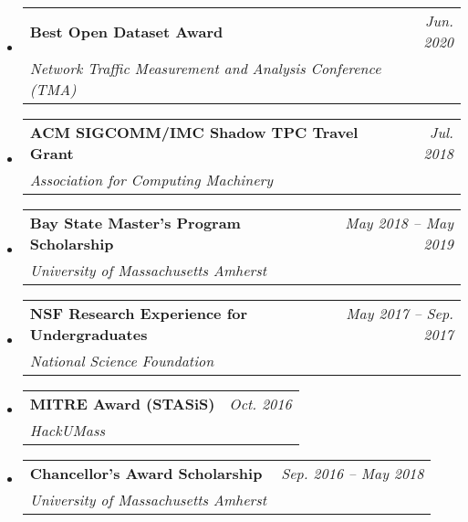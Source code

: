 \documentclass[letterpaper,11pt]{article}
\makeatletter
\newcommand{\ressubheadingNONITtwo}[4]{
\begin{tabular*}{6.5in}{l@{\cftdotfill{\cftsecdotsep}\extracolsep{\fill}}r}
		\textbf{#1} & \textit{#4} \\
    \textit{#2} & \\
\end{tabular*}\vspace{-6pt}}
\makeatother
\begin{document}
\begin{itemize}
\item
\ressubheadingNONITtwo{Best Open Dataset Award}{Network Traffic Measurement and Analysis Conference (TMA)}{}{Jun. 2020}
\item
\ressubheadingNONITtwo{ACM SIGCOMM/IMC Shadow TPC Travel Grant}{Association for Computing Machinery}{}{Jul. 2018}
\item
\ressubheadingNONITtwo{Bay State Master's Program Scholarship}{University of Massachusetts Amherst}{}{May 2018 -- May 2019}
\item
\ressubheadingNONITtwo{NSF Research Experience for Undergraduates}{National Science Foundation}{}{May 2017 -- Sep. 2017}
\item
\ressubheadingNONITtwo{MITRE Award (STASiS)}{HackUMass}{}{Oct. 2016}
\item
\ressubheadingNONITtwo{Chancellor's Award Scholarship}{University of Massachusetts Amherst}{}{Sep. 2016 -- May 2018}
\end{itemize}
\end{document}
